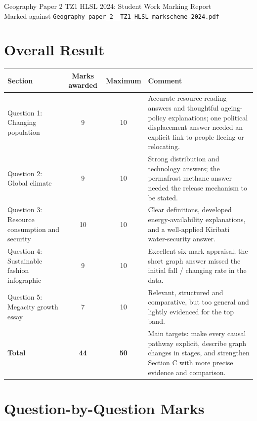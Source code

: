 \documentclass[11pt]{article}
\begin{document}
\begin{center}
  {\Large Geography Paper 2 TZ1 HLSL 2024: Student Work Marking Report}\\[4pt]
  {\normalsize Marked against \texttt{Geography\_paper\_2\_\_TZ1\_HLSL\_markscheme-2024.pdf}}
\end{center}

\section*{Overall Result}

\begin{tabularx}{\textwidth}{@{}p{} c c Y@{}}
\toprule
Section & Marks awarded & Maximum & Comment \\
\midrule
Question 1: Changing population & 9 & 10 & Accurate resource-reading answers and thoughtful ageing-policy explanations; one political displacement answer needed an explicit link to people fleeing or relocating. \\
Question 2: Global climate & 9 & 10 & Strong distribution and technology answers; the permafrost methane answer needed the release mechanism to be stated. \\
Question 3: Resource consumption and security & 10 & 10 & Clear definitions, developed energy-availability explanations, and a well-applied Kiribati water-security answer. \\
Question 4: Sustainable fashion infographic & 9 & 10 & Excellent six-mark appraisal; the short graph answer missed the initial fall / changing rate in the data. \\
Question 5: Megacity growth essay & 7 & 10 & Relevant, structured and comparative, but too general and lightly evidenced for the top band. \\
\midrule
\textbf{Total} & \textbf{44} & \textbf{50} & Main targets: make every causal pathway explicit, describe graph changes in stages, and strengthen Section C with more precise evidence and comparison. \\
\bottomrule
\end{tabularx}

\section*{Question-by-Question Marks}
\end{document}
